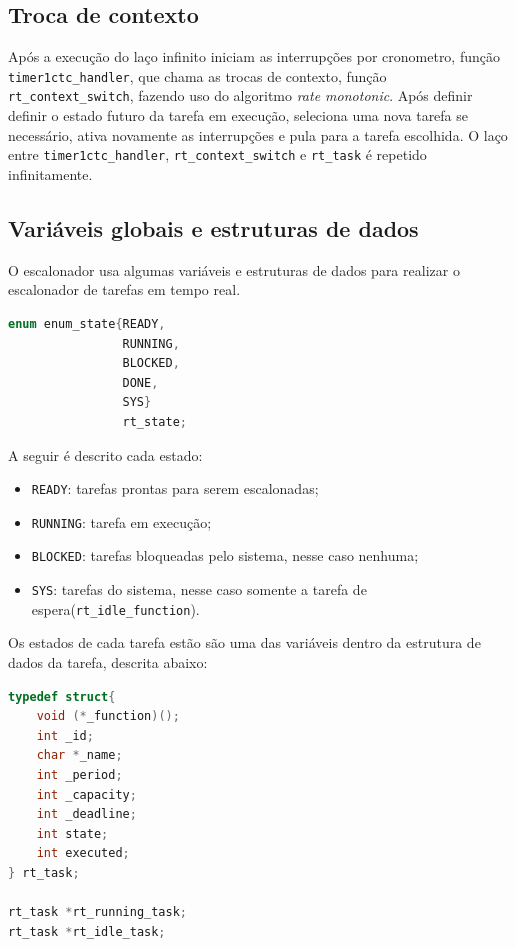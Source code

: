 \documentclass[a4 paper]{article}
\begin{document}
\subsection{Troca de contexto}
Após a execução do laço infinito iniciam as interrupções  por cronometro, função \verb|timer1ctc_handler|, que chama as trocas de contexto, função \verb|rt_context_switch|, fazendo uso do algoritmo \textit{rate monotonic}. Após definir definir o estado futuro da tarefa em execução, seleciona uma nova tarefa se necessário, ativa novamente as interrupções e pula para a tarefa escolhida. O laço entre \verb|timer1ctc_handler|,  \verb|rt_context_switch| e \verb|rt_task| é repetido infinitamente.

\subsection{Variáveis globais e estruturas de dados}

O escalonador usa algumas variáveis e estruturas de dados para realizar o escalonador de tarefas em tempo real. 

\begin{lstlisting}[captionpos=b, language=C, caption=Estado da tarefa]
enum enum_state{READY,
                RUNNING,
                BLOCKED,
                DONE,
                SYS}
                rt_state;
\end{lstlisting}

A seguir é descrito cada estado:

\begin{itemize}
\item \verb|READY|: tarefas prontas para serem escalonadas;
\item \verb|RUNNING|: tarefa em execução;
\item \verb|BLOCKED|: tarefas bloqueadas pelo sistema, nesse caso nenhuma;
\item \verb|SYS|: tarefas do sistema, nesse caso somente a tarefa de espera(\verb|rt_idle_function|).
\end{itemize}

Os estados de cada tarefa estão são uma das variáveis dentro da estrutura de dados da tarefa, descrita abaixo:

\begin{lstlisting}[captionpos=b, language=C, caption=Estrutura de dados das tarefa, label={lst:rt_task}]
typedef struct{
    void (*_function)();
    int _id;
    char *_name;
    int _period;
    int _capacity;
    int _deadline;
    int state;
    int executed;
} rt_task;

rt_task *rt_running_task;
rt_task *rt_idle_task;
\end{lstlisting}
\end{document}
